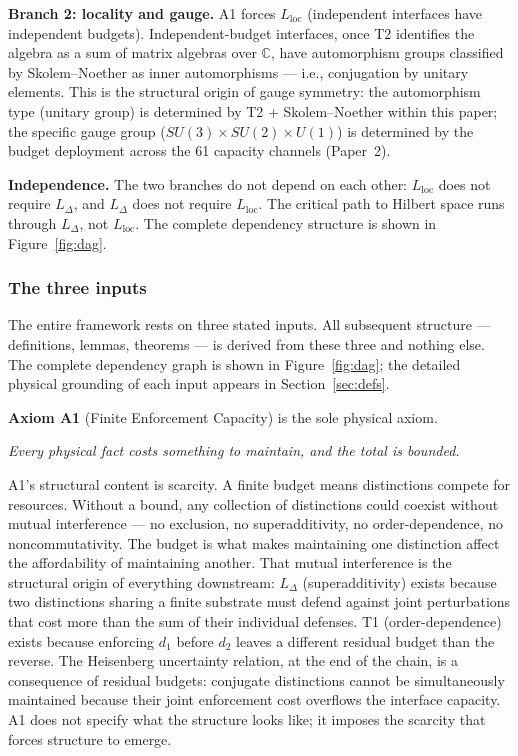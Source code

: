 \documentclass[11pt]{article}
\theoremstyle{remark}
\begin{document}
\medskip
\noindent\textbf{Branch 2: locality and gauge.}\enspace{}
A1 forces $L_{\mathrm{loc}}$ (independent interfaces have independent budgets).  Independent-budget interfaces, once T2 identifies the algebra as a sum of matrix algebras over $\mathbb{C}$, have automorphism groups classified by Skolem--Noether as inner automorphisms --- i.e., conjugation by unitary elements.  This is the structural origin of gauge symmetry: the automorphism type (unitary group) is determined by T2 + Skolem--Noether within this paper; the specific gauge group ($SU(3) \times SU(2) \times U(1)$) is determined by the budget deployment across the 61 capacity channels (Paper~2).

\medskip
\noindent\textbf{Independence.}\enspace{}
The two branches do not depend on each other: $L_{\mathrm{loc}}$ does not require $L_\Delta$, and $L_\Delta$ does not require $L_{\mathrm{loc}}$.  The critical path to Hilbert space runs through $L_\Delta$, not $L_{\mathrm{loc}}$.  The complete dependency structure is shown in Figure~\ref{fig:dag}.


\label{sec:axiom}

\subsubsection*{The three inputs}

The entire framework rests on three stated inputs.  All subsequent structure --- definitions, lemmas, theorems --- is derived from these three and nothing else.  The complete dependency graph is shown in Figure~\ref{fig:dag}; the detailed physical grounding of each input appears in Section~\ref{sec:defs}.

\medskip
\noindent\textbf{Axiom A1} (Finite Enforcement Capacity) is the sole physical axiom.

\smallskip\noindent\textit{Every physical fact costs something to maintain, and the total is bounded.}

\smallskip\noindent A1's structural content is scarcity.  A finite budget means distinctions compete for resources.  Without a bound, any collection of distinctions could coexist without mutual interference --- no exclusion, no superadditivity, no order-dependence, no noncommutativity.  The budget is what makes maintaining one distinction affect the affordability of maintaining another.  That mutual interference is the structural origin of everything downstream: $L_\Delta$ (superadditivity) exists because two distinctions sharing a finite substrate must defend against joint perturbations that cost more than the sum of their individual defenses.  T1 (order-dependence) exists because enforcing $d_1$ before $d_2$ leaves a different residual budget than the reverse.  The Heisenberg uncertainty relation, at the end of the chain, is a consequence of residual budgets: conjugate distinctions cannot be simultaneously maintained because their joint enforcement cost overflows the interface capacity.  A1 does not specify what the structure looks like; it imposes the scarcity that forces structure to emerge.
\end{document}
